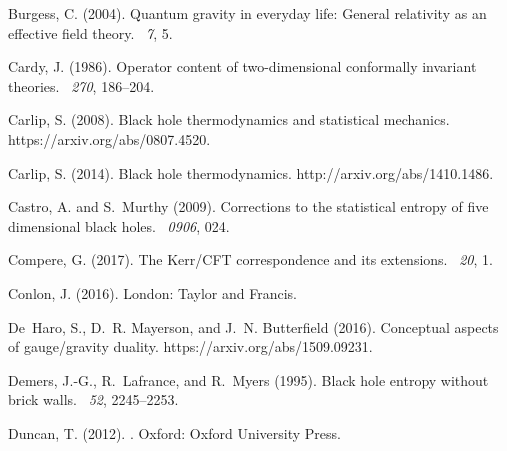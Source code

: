 \documentclass{article}
\begin{document}
\begin{thebibliography}{}
Burgess, C. (2004).
\newblock Quantum gravity in everyday life: General relativity as an effective
  field theory.
~{\em 7}, 5.

Cardy, J. (1986).
\newblock Operator content of two-dimensional conformally invariant theories.
~{\em 270}, 186--204.

Carlip, S. (2008).
\newblock Black hole thermodynamics and statistical mechanics.
\newblock https://arxiv.org/abs/0807.4520.

Carlip, S. (2014).
\newblock Black hole thermodynamics.
\newblock http://arxiv.org/abs/1410.1486.

Castro, A. and S.~Murthy (2009).
\newblock Corrections to the statistical entropy of five dimensional black
  holes.
~{\em 0906}, 024.

Compere, G. (2017).
\newblock The {K}err/{CFT} correspondence and its extensions.
~{\em 20}, 1.

Conlon, J. (2016).
\newblock London: Taylor and Francis.

De~Haro, S., D.~R. Mayerson, and J.~N. Butterfield (2016).
\newblock Conceptual aspects of gauge/gravity duality.
\newblock https://arxiv.org/abs/1509.09231.

Demers, J.-G., R.~Lafrance, and R.~Myers (1995).
\newblock Black hole entropy without brick walls.
~{\em 52}, 2245--2253.

Duncan, T. (2012).
.
\newblock Oxford: Oxford University Press.


\end{thebibliography}
\end{document}

